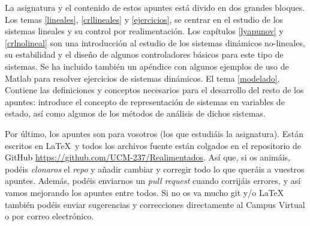 La asignatura y el contenido de estos apuntes está divido en dos grandes bloques. Los temas \ref{lineales}, \ref{crllineales} y \ref{ejercicios}, se centrar en el estudio de los sistemas lineales y su control por realimentación.   Los capítulos \ref{lyapunov} y \ref{crlnolineal} son una introducción al estudio de los sistemas dinámicos no-lineales, su estabilidad y el diseño de algunos controladores básicos para este tipo de sistemas. Se ha incluido también un apéndice con algunos ejemplos de uso de Matlab para resolver ejercicios de sistemas dinámicos. El tema \ref{modelado}, Contiene las definiciones y conceptos necesarios para el desarrollo del resto de los apuntes: introduce el concepto de representación de sistemas en variables de estado, así como algunos de los métodos de análisis de dichos sistemas. 

Por último, los apuntes son para vosotros (los que estudiáis la asignatura). Están escritos en \LaTeX\ y todos los archivos fuente están colgados en el repositorio de GitHub \url{https://github.com/UCM-237/Realimentados}. Así que, si os animáis, podéis \emph{clonaros} el \emph{repo} y añadir cambiar y corregir todo lo que queráis a vuestros apuntes. Además, podéis enviarnos un \emph{pull request} cuando corrijáis errores, y así vamos mejorando los apuntes entre todos. Si no os va mucho git y/o \LaTeX\, también podéis enviar sugerencias y correcciones directamente al Campus Virtual o por correo electrónico.


